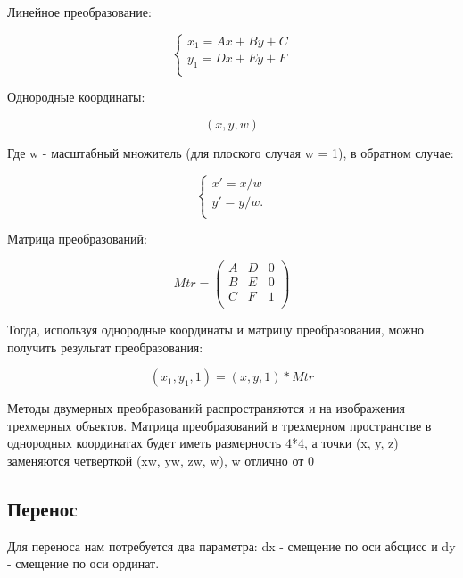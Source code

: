 Линейное преобразование:

\begin{equation}
	{\begin{cases}
			x_1 = Ax + By + C \\
			y_1 = Dx + Ey + F \\
		\end{cases}}
\end{equation}

Однородные координаты:

\begin{equation}
	(x, y, w)
\end{equation}

Где w - масштабный множитель (для плоского случая w = 1), в обратном случае:

\begin{equation}
	{\begin{cases}
			x' = x / w  \\
			y' = y / w. \\
		\end{cases}}
\end{equation}

Матрица преобразований:

\begin{equation}
	Mtr = \left(
	\begin{array}{cccc}
			A & D & 0 \\
			B & E & 0 \\
			C & F & 1 \\
		\end{array}
	\right)
\end{equation}

Тогда, используя однородные координаты и матрицу преобразования, можно получить результат преобразования:

\begin{equation}
	(x_1, y_1, 1) = (x, y, 1) * Mtr
\end{equation}

Методы двумерных преобразований распространяются и на изображения трехмерных объектов.
Матрица преобразований  в трехмерном пространстве  в однородных координатах будет иметь размерность 4*4,
а точки (x, y, z)
заменяются четверткой (xw, yw, zw, w), w отлично от 0

\subsection {Перенос}

Для переноса нам потребуется два параметра: dx - смещение по оси абсцисс и dy - смещение по оси ординат.

